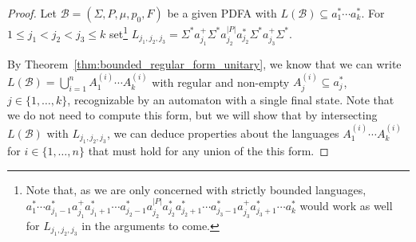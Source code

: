 \begin{proof}
 Let $\mathcal B = (\Sigma, P, \mu, p_0, F)$
 be a given PDFA with $L(\mathcal B) \subseteq a_1^* \cdots a_k^*$.
 For $1 \le j_1 < j_2 < j_3 \le k$
 set\footnote{Note that, as we are only concerned with strictly bounded languages,
  $ %
  a_1^* \cdots a_{j_1-1}^* a_{j_1}^+ a_{j_1+1}^*\cdots a_{j_2-1}^* a_{j_2}^{|P|}a_{j_2}^* a_{j_2+1}^* \cdots a_{j_3-1}^*a_{j_3}^+ a_{j_3+1}^* \cdots a_k^*
 $
 would work as well for $L_{j_1, j_2, j_3}$ in the arguments to come.}
 $
  L_{j_1, j_2, j_3} = \Sigma^* a_{j_1}^+ \Sigma^* a_{j_2}^{|P|}a_{j_2}^* \Sigma^* a_{j_3}^+ \Sigma^*.
 $
\begin{comment}
 \medskip 
 
 \noindent\underline{Claim:} We have $L(\mathcal B) \cap L_{j_1, j_2, j_3} \ne \emptyset$
 if and only if 
 $$
  \forall N \exists w \in L(\mathcal B) : |w|_{a_{j_1}} > 0, |w|_{a_{j_3}} > 0, |w|_{a_j2} \ge N.
 $$
 \begin{quote}
     \emph{Proof of the claim.}
      First, suppose $L(\mathcal B) \cap L_{j_1, j_2, j_3} \ne \emptyset$.
      Then, we find $w \in L(\mathcal B)$
      such that $|w|_{a_{j_1}} > 0$, $|w|_{a_{j_3}} > 0$
      and $|w|_{a_{j_2}} \ge |P|$.
      Write $w = ua_{j_2}^{|P|}v$ for some $u,v \in \Sigma^*$.
      By the pigenhole principle, as $w$ is read in $\mathcal B$,
      it has to traverse some state twice as it reads 
      the factor $a_{j_2}^{|P|}$, so we can pump
      some non-empty factor $a_{j_2}^p$ of it with $0 < p \le |P|$.
      Hence,
      \[
       ua_{j_2}^{|P| + ip}v \subseteq L(\mathcal B)
      \]
      for all $i \ge 0$. In particular, this yields that the stated formula is valid.
      
      Conversely, assume the formula is valid for $L(\mathcal B)$.
      As $L(\mathcal B) \subseteq a_1^* \cdots a_k^*$,
      if $w \in L(\mathcal B)$ we can write
      \[
       w = a_1^{|w|_{a_1}} \cdots a_k^{|w|_{a_k}}.
      \]
      Set $N = |P|$ and choose any $w \in L(\mathcal B)$, which
      existence is guaranteed by the formula.
      Then, by the above, $w \in L_{j_1, j_2, j_3}$.
     
     [\emph{End, proof of the claim.}]
 \end{quote}
\end{comment}
 By Theorem~\ref{thm:bounded_regular_form_unitary}, we know that we can write
 $
  L(\mathcal B) = \bigcup_{i=1}^n A_1^{(i)} \cdots A_k^{(i)}
 $
 with regular and non-empty $A_j^{(i)} \subseteq a_j^*$, $j \in \{1,\ldots,k\}$, recognizable by an automaton
 with a single final state.
 Note that we do not need to compute this form, but we will show that
 by intersecting $L(\mathcal B)$
 with $L_{j_1, j_2, j_3}$, we can deduce properties
 about the languages $A_1^{(i)} \cdots A_k^{(i)}$
 for $i \in \{1,\ldots,n\}$ that must hold for any union of the 
 this form.
 

\end{proof}
